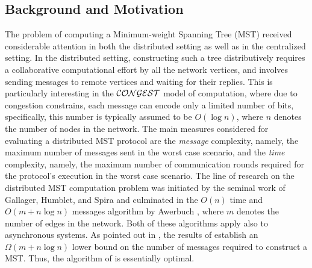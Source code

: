\documentclass[11pt,letter]{article}
\begin{document}
\subsection{Background and Motivation}
The problem of computing a Minimum-weight Spanning Tree (MST)  received considerable attention in both the 
distributed setting as well as in the  centralized setting. In the distributed setting, constructing such a tree distributively
requires a collaborative computational effort by all the network vertices, 
and involves sending messages to remote vertices and waiting for their replies. This is particularly interesting in the $\cal{CONGEST}$ model of computation, where due to congestion constrains, each message can encode only a limited number of bits, specifically, this number is typically assumed to be $O(\log n)$, where $n$ denotes the number of nodes in the network.
The main measures considered for evaluating a distributed MST protocol are the {\em message} complexity, namely, the maximum 
number of messages sent in the worst case scenario, 
and the {\em time} complexity, namely, the maximum number of communication rounds 
required for the protocol's execution in the worst case scenario.
The line of research on the distributed MST computation problem was initiated 
by the seminal work of Gallager, Humblet, and Spira \cite{GHS_83} 
and culminated in the $O(n)$ time and $O(m+n\log n)$ messages algorithm 
by Awerbuch \cite{A87}, where $m$ denotes the number of edges in the network. 
Both of these algorithms apply also to asynchronous systems.
As pointed out in \cite{A87}, the results of 
\cite{AGVP_90,B_80,FL_84} establish an $\Omega(m+n\log n)$ lower bound 
on the number of messages required to construct a MST.  
Thus, the algorithm of \cite{A87} is essentially optimal. 
\end{document}
